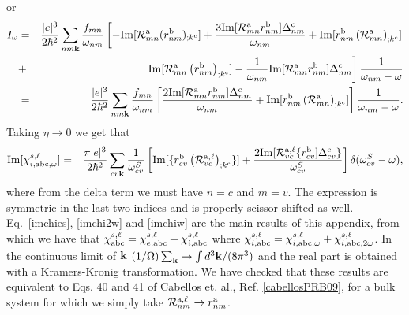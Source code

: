 or
\begin{eqnarray}\label{pfian}
I_{\omega}
&=&
\frac{|e|^3}{2\hbar^2}
\sum_{nm\mathbf{k}}
\frac{f_{mn}}{\omega_{nm}}
\left[
-\mathrm{Im}[{\cal R}^{\mathrm{a}}_{mn}(r^{\mathrm{b}}_{nm})_{;k^{\mathrm{c}}}]
+
\frac{3\mathrm{Im}[{\cal R}^{\mathrm{a}}_{mn}r^{\mathrm{b}}_{nm}]\Delta^{\mathrm{c}}_{nm}}{\omega_{nm}}
+
\mathrm{Im}[r^{\mathrm{b}}_{nm}\left({\cal R}^{\mathrm{a}}_{mn}\right)_{;k^{\mathrm{c}}}]
\right.
\nonumber\\
&+&
\left.
\mathrm{Im}[
{\cal R}^{\mathrm{a}}_{mn}
\left(
r^{\mathrm{b}}_{nm}
\right)_{;k^{\mathrm{c}}}
]
-
\frac{1}{\omega_{nm}}
\mathrm{Im}[{\cal R}^{\mathrm{a}}_{mn}r^{\mathrm{b}}_{nm}]
\Delta^{\mathrm{c}}_{nm}
\right]
\frac{1}{\omega_{nm}-\omega}
\nonumber\\
&=&
\frac{|e|^3}{2\hbar^2}
\sum_{nm\mathbf{k}}
\frac{f_{mn}}{\omega_{nm}}
\left[
\frac{2\mathrm{Im}[{\cal R}^{\mathrm{a}}_{mn}r^{\mathrm{b}}_{nm}]\Delta^{\mathrm{c}}_{nm}}{\omega_{nm}}
+
\mathrm{Im}[r^{\mathrm{b}}_{nm}\left({\cal R}^{\mathrm{a}}_{mn}\right)_{;k^{\mathrm{c}}}]
\right]
\frac{1}{\omega_{nm}-\omega}
.
\end{eqnarray}
Taking $\eta\to 0$ we get that
\begin{eqnarray}\label{imchiw}
\mathrm{Im}[\chi_{i,\mathrm{a}\mathrm{b}\mathrm{c},\omega}^{s,\ell}]
&=&
\frac{\pi|e|^3}{2\hbar^2}
\sum_{cv\mathbf{k}}
\frac{1}{\omega^S_{cv}}
\left[
\mathrm{Im}[\{r^{\mathrm{b}}_{cv}\left({\cal R}^{\mathrm{a},\ell}_{vc}\right)_{;k^{\mathrm{c}}}\}]
+
\frac{2\mathrm{Im}[{\cal R}^{\mathrm{a},\ell}_{vc}\{r^{\mathrm{b}}_{cv}]\Delta^{\mathrm{c}}_{cv}\}}{\omega^S_{cv}}
\right]
\delta(\omega^S_{cv}-\omega)
,
\end{eqnarray} 
where from the delta term we must have $n=c$ and $m=v$. The expression
is symmetric in the last two indices and is properly scissor shifted
as well. Eq.~\eqref{imchies}, \eqref{imchi2w} and \eqref{imchiw}
are the main results of this appendix, from which we have that
$\chi_{\mathrm{a}\mathrm{b}\mathrm{c}}^{s,\ell}=\chi_{e,\mathrm{a}\mathrm{b}\mathrm{c}}^{s,\ell}+\chi_{i,\mathrm{a}\mathrm{b}\mathrm{c}}^{s,\ell}$ 
where
$\chi_{i,\mathrm{a}\mathrm{b}\mathrm{c}}^{s,\ell}=\chi_{i,\mathrm{a}\mathrm{b}\mathrm{c},\omega}^{s,\ell}+\chi_{i,\mathrm{a}\mathrm{b}\mathrm{c},2\omega}^{s,\ell}$. 
In the continuous limit of $\mathbf{k}$ 
$(1/\Omega)\sum_{\mathbf{k}}\to\int d^3\mathbf{k}/(8\pi^3)$ and the real part is 
obtained with a Kramers-Kronig transformation. 
We have checked that these results are equivalent to Eqs. 40 and 41 of
Cabellos et. al., Ref. \ref{cabellosPRB09}, for a bulk system for which we
simply take ${\cal R}^{\mathrm{a},\ell}_{nm}\to r^{\mathrm{a}}_{nm}$.

